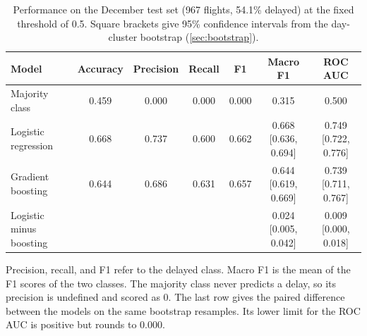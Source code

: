 \begin{table}[ht]
  \centering
  \caption{Performance on the December test set (\num{967} flights, 54.1\% delayed) at the fixed threshold of 0.5. Square brackets give 95\% confidence intervals from the day-cluster bootstrap (\cref{sec:bootstrap}).}
  \label{tab:metrics}
  \begin{threeparttable}
    \footnotesize
    \setlength{\tabcolsep}{2pt}
    \begin{tabular*}{\textwidth}{@{\extracolsep{\fill}}lcccccc@{}}
      \toprule
      Model & Accuracy & Precision & Recall & F1 & Macro F1 & ROC AUC \\
      \midrule
      Majority class & 0.459 & 0.000 & 0.000 & 0.000 & 0.315 & 0.500 \\
      Logistic regression & 0.668 & 0.737 & 0.600 & 0.662 & 0.668 [0.636, 0.694] & 0.749 [0.722, 0.776] \\
      Gradient boosting & 0.644 & 0.686 & 0.631 & 0.657 & 0.644 [0.619, 0.669] & 0.739 [0.711, 0.767] \\
      \midrule
      Logistic minus boosting & & & & & 0.024 [0.005, 0.042] & 0.009 [0.000, 0.018] \\
      \bottomrule
    \end{tabular*}
    \begin{tablenotes}
      \footnotesize
      \item Precision, recall, and F1 refer to the delayed class. Macro F1 is the mean of the F1 scores of the two classes. The majority class never predicts a delay, so its precision is undefined and scored as 0. The last row gives the paired difference between the models on the same bootstrap resamples. Its lower limit for the ROC AUC is positive but rounds to 0.000.
    \end{tablenotes}
  \end{threeparttable}
\end{table}
